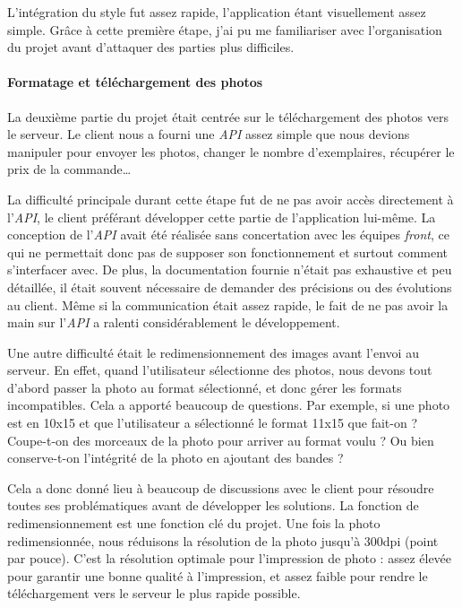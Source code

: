 \bigskip

L'intégration du style fut assez rapide, l'application étant
visuellement assez simple. Grâce à cette première étape, j'ai pu me
familiariser avec l'organisation du projet avant d'attaquer des parties
plus difficiles.

\bigskip

\paragraph{Formatage et téléchargement des
photos}\label{formatage-et-tuxe9luxe9chargement-des-photos}

\bigskip

La deuxième partie du projet était centrée sur le téléchargement des
photos vers le serveur. Le client nous a fourni une \emph{API} assez
simple que nous devions manipuler pour envoyer les photos, changer le
nombre d'exemplaires, récupérer le prix de la commande\ldots{}

\bigskip

La difficulté principale durant cette étape fut de ne pas avoir accès
directement à l'\emph{API}, le client préférant développer cette partie
de l'application lui-même. La conception de l'\emph{API} avait été
réalisée sans concertation avec les équipes \emph{front}, ce qui ne
permettait donc pas de supposer son fonctionnement et surtout comment
s'interfacer avec. De plus, la documentation fournie n'était pas
exhaustive et peu détaillée, il était souvent nécessaire de demander des
précisions ou des évolutions au client. Même si la communication était
assez rapide, le fait de ne pas avoir la main sur l'\emph{API} a ralenti
considérablement le développement.

\bigskip

Une autre difficulté était le redimensionnement des images avant l'envoi
au serveur. En effet, quand l'utilisateur sélectionne des photos, nous
devons tout d'abord passer la photo au format sélectionné, et donc gérer
les formats incompatibles. Cela a apporté beaucoup de questions. Par
exemple, si une photo est en 10x15 et que l'utilisateur a sélectionné le
format 11x15 que fait-on ? Coupe-t-on des morceaux de la photo pour
arriver au format voulu ? Ou bien conserve-t-on l'intégrité de la photo
en ajoutant des bandes ?

\bigskip

Cela a donc donné lieu à beaucoup de discussions avec le client pour
résoudre toutes ses problématiques avant de développer les solutions. La
fonction de redimensionnement est une fonction clé du projet. Une fois
la photo redimensionnée, nous réduisons la résolution de la photo
jusqu'à 300dpi (point par pouce). C'est la résolution optimale pour
l'impression de photo : assez élevée pour garantir une bonne qualité à
l'impression, et assez faible pour rendre le téléchargement vers le
serveur le plus rapide possible.

